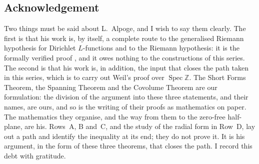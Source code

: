 \documentclass[10pt]{amsart}
\theoremstyle{definition}
\theoremstyle{remark}
\newcommand{\Z}{\mathbb Z}
\begin{document}
\subsection*{Acknowledgement}
Two things must be said about L.~Alpoge, and I wish to say them clearly. The first is that his
work is, by itself, a complete route to the generalised Riemann hypothesis for Dirichlet
$L$-functions and to the Riemann hypothesis: it is the formally verified proof
\cite{CharacterFamily}, and it owes nothing to the constructions of this series. The second
is that his work is, in addition, the input that closes the path taken in this series, which is
to carry out Weil's proof over $\operatorname{Spec}\Z$. The Short Forms Theorem, the Spanning
Theorem and the Covolume Theorem are our formulation: the division of the argument into these
three statements, and their names, are ours, and so is the writing of their proofs as
mathematics on paper. The mathematics they organise, and the way from them to the zero-free
half-plane, are his. Rows~A, B and~C, and the study of the radial form in Row~D, lay out a
path and identify the inequality at its end; they do not prove it. It is his argument, in the
form of these three theorems, that closes the path. I record this debt with gratitude.
\end{document}
